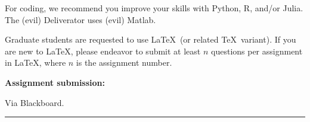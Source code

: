 {{%
For coding, we recommend you improve your skills with Python, R, and/or Julia. The (evil) Deliverator uses (evil) Matlab.

Graduate students are requested to use \LaTeX\ (or related \TeX\
variant). If you are new to \LaTeX, please endeavor to submit at least $n$ questions per assignment in \LaTeX, where $n$ is the assignment number.

\textbf{Assignment submission:}

Via Blackboard.


}

\medskip
\medskip

\hrule

\medskip
}
{} %
